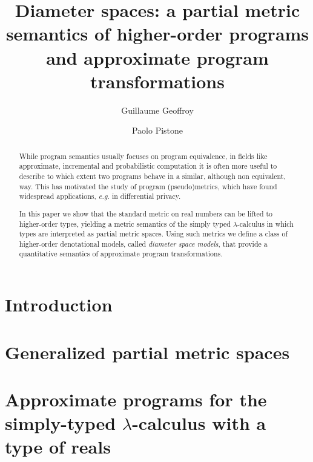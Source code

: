 \documentclass[a4paper,UKenglish,cleveref, autoref, english, thm-restate]{lipics-v2019}
\title{Diameter spaces: a partial metric semantics of higher-order programs and approximate program transformations} %
\author{Guillaume Geoffroy}
{Universit\`a di Bologna, Dipartimento Informatica-Scienza e Ingegneria, Italy}
{guillaume.geoffroy@unibo.it} 
{}
{}
\author{Paolo Pistone}
{Universit\`a di Bologna, Dipartimento Informatica-Scienza e Ingegneria, Italy}
{paolo.pistone2@unibo.it} 
{}
{}
\begin{document}
\maketitle

\begin{abstract}

While program semantics usually focuses on program equivalence, in fields like approximate, incremental and probabilistic computation it is often more useful to describe to which extent two programs behave in a similar, although non equivalent, way. This has motivated the study of program (pseudo)metrics, which have found widespread applications, \textit{e.g.} in differential privacy. 

In this paper we show that the standard metric on real numbers can be lifted to higher-order types, yielding a metric semantics of the simply typed $\lambda$-calculus in which types are interpreted as partial metric spaces.
Using such metrics we define a class of higher-order denotational models, called \emph{diameter space models}, that provide a quantitative semantics of approximate program transformations.


%

\end{abstract}


\section{Introduction}




\section{Generalized partial metric spaces}



\section{Approximate programs for the simply-typed $\lambda$-calculus with a type of reals}
\label{section:stlc}
\end{document}
